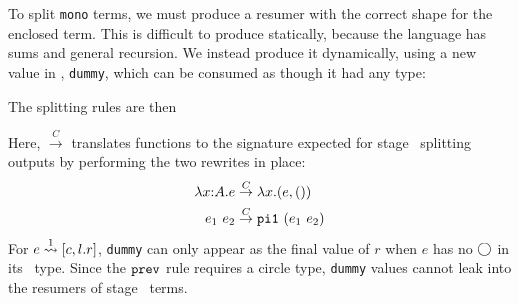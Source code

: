 To split \texttt{mono} terms, we must produce a resumer with the correct shape
for the enclosed term. This is difficult to produce statically, because the
language has sums and general recursion. We instead produce it dynamically,
using a new value in \langmono, \texttt{dummy}, which can be consumed as though
it had any type:
The splitting rules are then
\begin{mathpar}
\end{mathpar}
Here, $\overset{C}{\rightarrow}$ translates functions to the signature expected for stage \bbone\ splitting outputs
by performing the two rewrites in place:
\begin{align*}
\lam x A e &\overset{C}{\rightarrow} \lambda x.(e,())\\
e_1~e_2 &\overset{C}{\rightarrow} \pio~(e_1~e_2)
\end{align*}
For $\splitone e A {c,l.r}$, \texttt{dummy} can only appear as the 
final value of $r$ when $e$ has no $\fut$ in its \lang\ type.
Since the $\prev$ rule requires a circle type, \texttt{dummy} values cannot leak 
into the resumers of stage \bbtwo\ terms.



%

